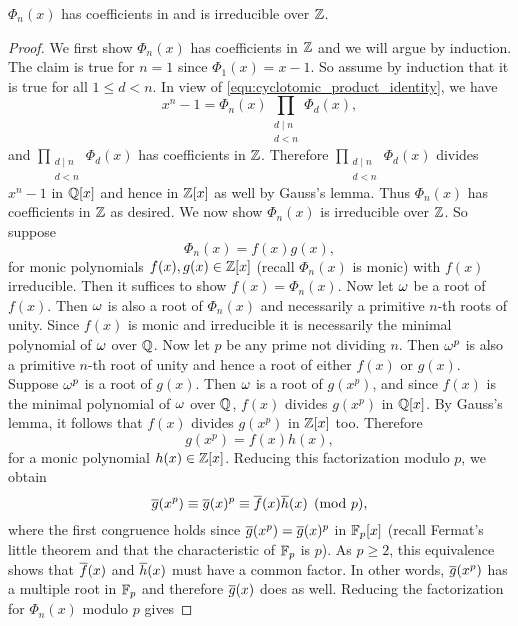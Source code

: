     \begin{proposition}\label{prop:cyclotomic_is_irreducible}
      $\Phi_{n}(x)$ has coefficients in and is irreducible over $\mathbb{Z}$.
    \end{proposition}
    \begin{proof}
      We first show $\Phi_{n}(x)$ has coefficients in $\mathbb{Z}$ and we will argue by induction. The claim is true for $n = 1$ since $\Phi_{1}(x) = x-1$. So assume by induction that it is true for all $1 \le d < n$. In view of \cref{equ:cyclotomic_product_identity}, we have
      \[
        x^{n}-1 = \Phi_{n}(x)\prod_{\substack{d \mid n \\ d < n}}\Phi_{d}(x),
      \]
      and $\prod_{\substack{d \mid n \\ d < n}}\Phi_{d}(x)$ has coefficients in $\mathbb{Z}$. Therefore $\prod_{\substack{d \mid n \\ d < n}}\Phi_{d}(x)$ divides $x^{n}-1$ in $\mathbb{Q}[x]$ and hence in $\mathbb{Z}[x]$ as well by Gauss's lemma. Thus $\Phi_{n}(x)$ has coefficients in $\mathbb{Z}$ as desired. We now show $\Phi_{n}(x)$ is irreducible over $\mathbb{Z}$. So suppose
      \[
        \Phi_{n}(x) = f(x)g(x),
      \]
      for monic polynomials $f(x),g(x) \in \mathbb{Z}[x]$ (recall $\Phi_{n}(x)$ is monic) with $f(x)$ irreducible. Then it suffices to show $f(x) = \Phi_{n}(x)$. Now let $\omega$ be a root of $f(x)$. Then $\omega$ is also a root of $\Phi_{n}(x)$ and necessarily a primitive $n$-th roots of unity. Since $f(x)$ is monic and irreducible it is necessarily the minimal polynomial of $\omega$ over $\mathbb{Q}$. Now let $p$ be any prime not dividing $n$. Then $\omega^{p}$ is also a primitive $n$-th root of unity and hence a root of either $f(x)$ or $g(x)$. Suppose $\omega^{p}$ is a root of $g(x)$. Then $\omega$ is a root of $g(x^{p})$, and since $f(x)$ is the minimal polynomial of $\omega$ over $\mathbb{Q}$, $f(x)$ divides $g(x^{p})$ in $\mathbb{Q}[x]$. By Gauss's lemma, it follows that $f(x)$ divides $g(x^{p})$ in $\mathbb{Z}[x]$ too. Therefore
      \[
        g(x^{p}) = f(x)h(x),
      \]
      for a monic polynomial $h(x) \in \mathbb{Z}[x]$. Reducing this factorization modulo $p$, we obtain
      \[
        \overline{g}(x^{p}) \equiv \overline{g}(x)^{p} \equiv \overline{f}(x)\overline{h}(x) \pmod{p},
      \]
      where the first congruence holds since $\overline{g}(x^{p}) = \overline{g}(x)^{p}$ in $\mathbb{F}_{p}[x]$ (recall Fermat's little theorem and that the characteristic of $\mathbb{F}_{p}$ is $p$). As $p \ge 2$, this equivalence shows that $\overline{f}(x)$ and $\overline{h}(x)$ must have a common factor. In other words, $\overline{g}(x^{p})$ has a multiple root in $\mathbb{F}_{p}$ and therefore $\overline{g}(x)$ does as well. Reducing the factorization for $\Phi_{n}(x)$ modulo $p$ gives

\end{proof}
